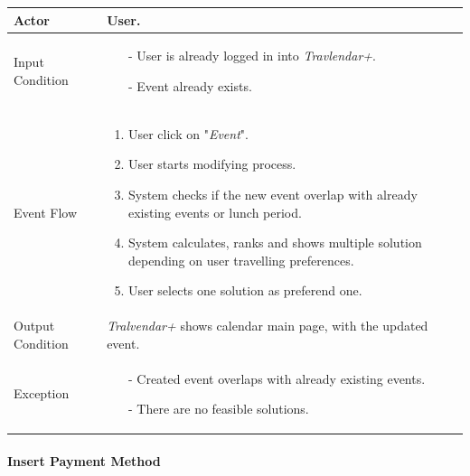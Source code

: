 		\begin{tabular}{| l | p{} | }
			\hline
			\hline
			Actor	&		User. \\
			\hline
			Input Condition		&		\begin{itemize}
													\item[-] User is already logged in into \textit{Travlendar+}.
													\item[-] Event already exists.
												\end{itemize} \\
			\hline
			Event Flow		&		\begin{enumerate}
												\item User click on "\textit{Event}".
												\item User starts modifying process.
												\item System checks if the new event overlap with already existing events or lunch period.
												\item	 System calculates, ranks and shows multiple solution depending on user travelling preferences.
												\item User selects one solution as preferend one.
											\end{enumerate} \\
			\hline
			Output Condition		&		\textit{Tralvendar+} shows calendar main page, with the updated event. \\
			\hline		
			Exception		&		\begin{itemize}
											\item[-] Created event overlaps with already existing events.
											\item[-] There are no feasible solutions.
										\end{itemize} \\
			\hline
			\hline
		\end{tabular}
		
		

	\paragraph{Insert Payment Method}
	

